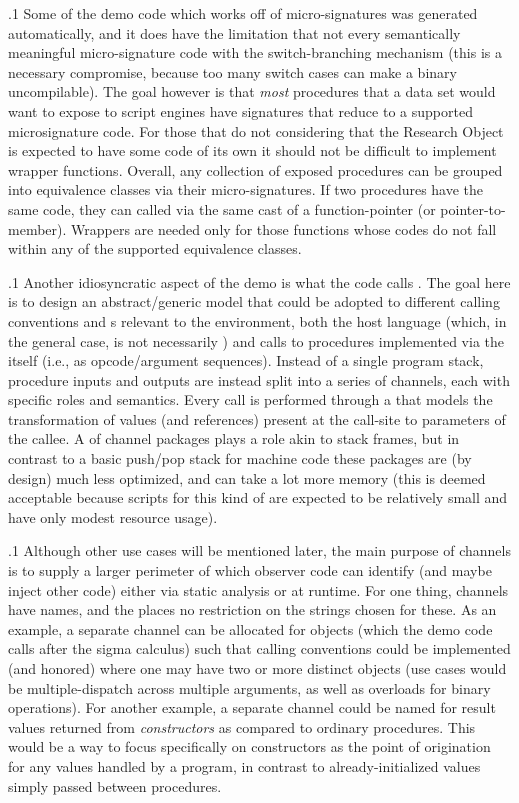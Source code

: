 \documentclass[11pt, twocolumn]{article}
\begin{document}
\p.1{%
Some of the demo code which works off of micro-signatures
was generated automatically, and it does have the
limitation that not every semantically meaningful micro-signature
code  with the switch-branching mechanism
(this is a necessary compromise, because too many
switch cases can make a binary uncompilable).
The goal however is that \textit{most}  procedures that a
data set would want to expose to script engines have signatures
that reduce to a supported microsignature code.
For those that do not \mdash{} considering that the
Research Object is expected to have some  code of its own
\mdash{} it should not be difficult to implement wrapper
functions. Overall, any collection of exposed
procedures can be grouped into equivalence classes via their
micro-signatures. If two procedures have the same code,
they can called via the same cast of a function-pointer
(or pointer-to-member). Wrappers are needed only for
those functions whose codes do not fall within any
of the supported equivalence classes.
}%

\p.1{%
Another idiosyncratic aspect of the demo  is what the code
calls . The goal here is to design an
abstract/generic model that
could be adopted to different calling conventions and
s relevant to the  environment, both the
host language (which, in the general case, is not
necessarily ) and calls to procedures
implemented via the  itself (i.e., as opcode/argument
sequences). Instead of a single program stack,
procedure inputs and outputs are instead split
into a series of channels, each with specific
roles and semantics. Every call is performed
through a  that models
the transformation of values (and references)
present at the call-site to parameters of the
callee. A  of channel packages
plays a role akin to stack frames, but in
contrast to a basic push/pop stack for machine code
these packages are (by design) much less optimized,
and can take a lot more memory (this is
deemed acceptable because scripts for this kind of
 are expected to be relatively small and have
only modest resource usage).
}%

\p.1{%
Although other use cases will be mentioned later, the main
purpose of channels is to supply a larger perimeter of
 which observer code can identify (and maybe inject other code) either via
static analysis or at runtime. For one thing, channels
have names, and the  places no restriction on the strings
chosen for these. As an example, a separate channel can be allocated
for  objects (which the demo code calls 
after the sigma calculus) such that calling conventions
could be implemented (and honored) where one may have
two or more distinct  objects
(use cases would be multiple-dispatch across multiple
arguments, as well as overloads for binary operations).
For another example, a separate channel could be
named for result values returned from \textit{constructors}
as compared to ordinary procedures. This would be a
way to focus specifically on constructors as
the point of origination for
any values handled by a program, in contrast
to already-initialized values simply passed
between procedures.
}%
\end{document}
